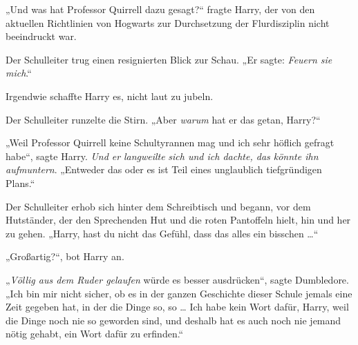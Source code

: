 „Und was hat Professor Quirrell dazu gesagt?“ fragte Harry, der von den aktuellen Richtlinien von Hogwarts zur Durchsetzung der Flurdisziplin nicht beeindruckt war.

Der Schulleiter trug einen resignierten Blick zur Schau.
„Er sagte: \emph{Feuern sie mich}.“

Irgendwie schaffte Harry es, nicht laut zu jubeln.

Der Schulleiter runzelte die Stirn.
„Aber \emph{warum} hat er das getan, Harry?“

„Weil Professor Quirrell keine Schultyrannen mag und ich sehr höflich gefragt habe“, sagte Harry. \emph{Und er} \emph{langweilte} \emph{sich und ich dachte, das könnte ihn aufmuntern}.
„Entweder das oder es ist Teil eines unglaublich tiefgründigen Plans.“

Der Schulleiter erhob sich hinter dem Schreibtisch und begann, vor dem Hutständer, der den Sprechenden Hut und die roten Pantoffeln hielt, hin und her zu gehen.
„Harry, hast du nicht das Gefühl, dass das alles ein bisschen …“

„Großartig?“, bot Harry an.

„\emph{Völlig aus dem Ruder gelaufen} würde es besser ausdrücken“, sagte Dumbledore.
„Ich bin mir nicht sicher, ob es in der ganzen Geschichte dieser Schule jemals eine Zeit gegeben hat, in der die Dinge so, so … Ich habe kein Wort dafür, Harry, weil die Dinge noch nie so geworden sind, und deshalb hat es auch noch nie jemand nötig gehabt, ein Wort dafür zu erfinden.“


